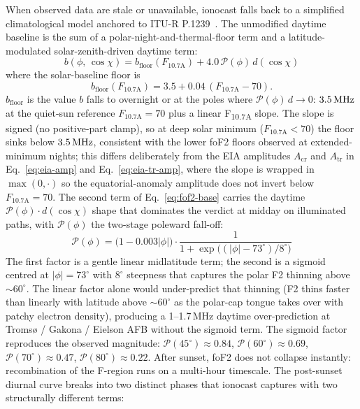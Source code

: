 \documentclass[11pt,a4paper]{article}
\newcommand{\si}[1]{\text{#1}}
\newcommand{\MHz}{\text{MHz}}
\begin{document}
When observed data are stale or unavailable, ionocast falls back to a
simplified climatological model anchored to ITU-R
P.1239~\cite{itup1239}.  The unmodified daytime baseline is the sum
of a polar-night-and-thermal-floor term and a latitude-modulated
solar-zenith-driven daytime term:
\begin{equation}\label{eq:fof2-base}
  b(\phi,\,\cos\chi)
    = b_{\text{floor}}(F_{10.7\text{A}})
      + 4.0\,\mathcal{P}(\phi)\,d(\cos\chi)
\end{equation}
where the solar-baseline floor is
\begin{equation}\label{eq:fof2-base-floor}
  b_{\text{floor}}(F_{10.7\text{A}})
    = 3.5 + 0.04\,(F_{10.7\text{A}} - 70).
\end{equation}
$b_{\text{floor}}$ is the value $b$ falls to overnight or at the
poles where $\mathcal{P}(\phi)\,d \to 0$: $3.5\,\si{\MHz}$ at the
quiet-sun reference $F_{10.7\text{A}} = 70$ plus a linear
F\textsubscript{10.7A} slope.  The slope is signed (no
positive-part clamp), so at deep solar minimum
($F_{10.7\text{A}} < 70$) the floor sinks below
$3.5\,\si{\MHz}$, consistent with the lower foF2 floors observed
at extended-minimum nights; this differs deliberately from the
EIA amplitudes $A_{\text{cr}}$ and $A_{\text{tr}}$ in
Eq.~\ref{eq:eia-amp} and Eq.~\ref{eq:eia-tr-amp}, where the
slope is wrapped in $\max(0, \cdot)$ so the equatorial-anomaly
amplitude does not invert below $F_{10.7\text{A}} = 70$.  The
second term of Eq.~\ref{eq:fof2-base} carries the daytime
$\mathcal{P}(\phi) \cdot d(\cos\chi)$ shape that dominates the
verdict at midday on illuminated paths, with
$\mathcal{P}(\phi)$ the two-stage poleward fall-off:
\begin{equation}\label{eq:fof2-poleward}
  \mathcal{P}(\phi) = \bigl(1 - 0.003|\phi|\bigr) \cdot
                      \frac{1}{1 + \exp\!\bigl((|\phi| - 73^\circ)/8^\circ\bigr)}
\end{equation}
The first factor is a gentle linear midlatitude term; the second is
a sigmoid centred at $|\phi| = 73^\circ$ with $8^\circ$ steepness
that captures the polar F2 thinning above $\sim\!60^\circ$.
The linear factor alone would under-predict that thinning
(F2 thins faster than linearly with latitude above $\sim
60^\circ$ as the polar-cap tongue takes over with patchy
electron density), producing a 1--1.7\,MHz daytime over-prediction
at Tromsø / Gakona / Eielson AFB without the sigmoid term.
The sigmoid factor reproduces the observed magnitude:
$\mathcal{P}(45^\circ) \approx 0.84$, $\mathcal{P}(60^\circ) \approx 0.69$,
$\mathcal{P}(70^\circ) \approx 0.47$, $\mathcal{P}(80^\circ) \approx 0.22$.
After sunset, foF2 does not collapse instantly: recombination
of the F-region runs on a multi-hour timescale.  The post-sunset
diurnal curve breaks into two distinct phases that ionocast
captures with two structurally different terms:
\end{document}
